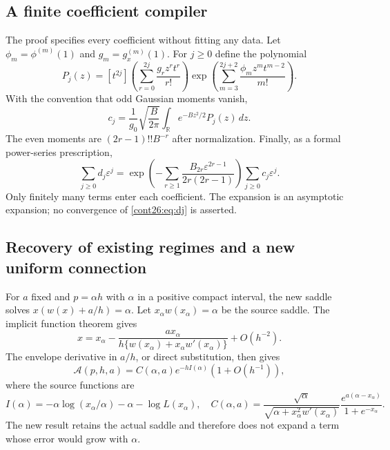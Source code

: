 \subsection{A finite coefficient compiler}
The proof specifies every coefficient without fitting any data. Let
$\phi_m=\phi^{(m)}(1)$ and $g_m=g_x^{(m)}(1)$.
For $j\geq0$ define the polynomial
\begin{equation}\label{cont26:eq:cj-polynomial}
 P_j(z)=[t^{2j}]
 \left(\sum_{r=0}^{2j}\frac{g_rz^rt^r}{r!}\right)
 \exp\left(\sum_{m=3}^{2j+2}\frac{\phi_mz^mt^{m-2}}{m!}\right).
\end{equation}
With the convention that odd Gaussian moments vanish,
\begin{equation}\label{cont26:eq:cj}
 c_j=\frac1{g_0}\sqrt{\frac B{2\pi}}
      \int_{\mathbb R}e^{-Bz^2/2}P_j(z)\,dz.
\end{equation}
The even moments are $(2r-1)!!B^{-r}$ after normalization.
Finally, as a formal power-series prescription,
\begin{equation}\label{cont26:eq:dj}
 \sum_{j\geq0}d_j\varepsilon^j
 =\exp\left(-\sum_{r\geq1}
 \frac{B_{2r}\varepsilon^{2r-1}}{2r(2r-1)}\right)
     \sum_{j\geq0}c_j\varepsilon^j.
\end{equation}
Only finitely many terms enter each coefficient. The expansion is an
asymptotic expansion; no convergence of \eqref{cont26:eq:dj} is asserted.

\subsection{Recovery of existing regimes and a new uniform connection}
For $a$ fixed and $p=\alpha h$ with $\alpha$ in a positive compact
interval, the new saddle solves
$x(w(x)+a/h)=\alpha$. Let $x_\alpha w(x_\alpha)=\alpha$ be the
source saddle. The implicit function theorem gives
\[
 x=x_\alpha-\frac{a x_\alpha}{h\{w(x_\alpha)+x_\alpha w'(x_\alpha)\}}
 +O(h^{-2}).
\]
The envelope derivative in $a/h$, or direct substitution, then gives
\begin{equation}\label{cont26:eq:old-recovery}
 \mathcal A(p,h,a)
 =C(\alpha,a)e^{-hI(\alpha)}(1+O(h^{-1})),
\end{equation}
where the source functions are
\[
 I(\alpha)=-\alpha\log(x_\alpha/\alpha)-\alpha-\log L(x_\alpha),
 \quad
 C(\alpha,a)=
 \frac{\sqrt{\alpha}}{\sqrt{\alpha+x_\alpha^2w'(x_\alpha)}}
 \frac{e^{a(\alpha-x_\alpha)}}{1+e^{-x_\alpha}}.
\]
The new result retains the actual saddle and therefore does not
expand a term whose error would grow with $\alpha$.

